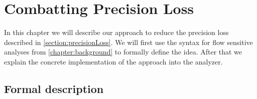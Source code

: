 
\chapter{Combatting Precision Loss}\label{chapter:mainContributions}
  In this chapter we will describe our approach to reduce the precision loss described in \autoref{section:precisionLoss}. We will first use the syntax for flow sensitive analyses from \autoref{chapter:background} to formally define the idea. After that we explain the concrete implementation of the approach into the \gob analyzer.
  \section{Formal description}
